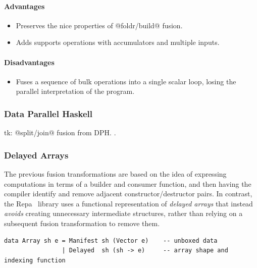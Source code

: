 \paragraph{Advantages}
\begin{itemize}
    \item Preserves the nice properties of
        @foldr/build@ fusion.
    \item Adds supports operations with accumulators and multiple inputs.
\end{itemize}

\paragraph{Disadvantages}
\begin{itemize}
    \item Fuses a sequence of bulk operations into a single scalar loop, losing
        the parallel interpretation of the program.
\end{itemize}



\subsubsection{Data Parallel Haskell}
tk: @split/join@ fusion from
DPH.
\citet{Chakravarty:2007tc,Jones:2008uu}.


\subsubsection{Delayed Arrays}

The previous fusion transformations are based on the idea of expressing
computations in terms of a builder and consumer function, and then having the
compiler identify and remove adjacent constructor/destructor pairs. In contrast,
the Repa~\cite{Keller:2010er} library uses a functional representation of
\emph{delayed arrays} that instead \emph{avoids}
creating unnecessary intermediate structures, rather than relying on a
subsequent fusion transformation to remove them.

\begin{lstlisting}[style=Haskell,numbers=none,caption={Repa-1 style array definition},label={lst:repa_arrays}]
data Array sh e = Manifest sh (Vector e)    -- unboxed data
                | Delayed  sh (sh -> e)     -- array shape and indexing function
\end{lstlisting}

